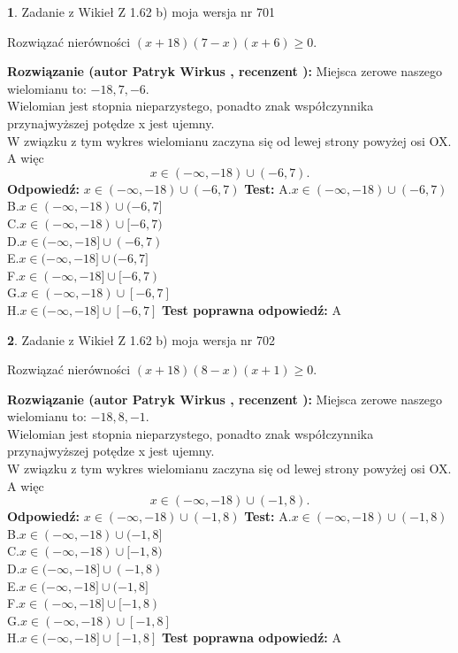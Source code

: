 \documentclass[12pt, a4paper]{article}
\theoremstyle{definition} %
\newtheorem{zad}{}
\newcommand{\zadStart}[1]{\begin{zad}#1\newline}
\newcommand{\zadStop}{\end{zad}}
\newcommand{\rozwStart}[2]{\noindent \textbf{Rozwiązanie (autor #1 , recenzent #2): }\newline}
\newcommand{\rozwStop}{\newline}
\newcommand{\odpStart}{\noindent \textbf{Odpowiedź:}\newline}
\newcommand{\odpStop}{\newline}
\newcommand{\testStart}{\noindent \textbf{Test:}\newline}
\newcommand{\testStop}{\newline}
\newcommand{\kluczStart}{\noindent \textbf{Test poprawna odpowiedź:}\newline}
\newcommand{\kluczStop}{\newline}
\begin{document}
\zadStart{Zadanie z Wikieł Z 1.62 b) moja wersja nr 701}

Rozwiązać nierówności $(x+18)(7-x)(x+6)\ge0$.
\zadStop
\rozwStart{Patryk Wirkus}{}
Miejsca zerowe naszego wielomianu to: $-18, 7, -6$.\\
Wielomian jest stopnia nieparzystego, ponadto znak współczynnika przy\linebreak najwyższej potędze x jest ujemny.\\ W związku z tym wykres wielomianu zaczyna się od lewej strony powyżej osi OX. A więc $$x \in (-\infty,-18) \cup (-6,7).$$
\rozwStop
\odpStart
$x \in (-\infty,-18) \cup (-6,7)$
\odpStop
\testStart
A.$x \in (-\infty,-18) \cup (-6,7)$\\
B.$x \in (-\infty,-18) \cup (-6,7]$\\
C.$x \in (-\infty,-18) \cup [-6,7)$\\
D.$x \in (-\infty,-18] \cup (-6,7)$\\
E.$x \in (-\infty,-18] \cup (-6,7]$\\
F.$x \in (-\infty,-18] \cup [-6,7)$\\
G.$x \in (-\infty,-18) \cup [-6,7]$\\
H.$x \in (-\infty,-18] \cup [-6,7]$
\testStop
\kluczStart
A
\kluczStop



\zadStart{Zadanie z Wikieł Z 1.62 b) moja wersja nr 702}

Rozwiązać nierówności $(x+18)(8-x)(x+1)\ge0$.
\zadStop
\rozwStart{Patryk Wirkus}{}
Miejsca zerowe naszego wielomianu to: $-18, 8, -1$.\\
Wielomian jest stopnia nieparzystego, ponadto znak współczynnika przy\linebreak najwyższej potędze x jest ujemny.\\ W związku z tym wykres wielomianu zaczyna się od lewej strony powyżej osi OX. A więc $$x \in (-\infty,-18) \cup (-1,8).$$
\rozwStop
\odpStart
$x \in (-\infty,-18) \cup (-1,8)$
\odpStop
\testStart
A.$x \in (-\infty,-18) \cup (-1,8)$\\
B.$x \in (-\infty,-18) \cup (-1,8]$\\
C.$x \in (-\infty,-18) \cup [-1,8)$\\
D.$x \in (-\infty,-18] \cup (-1,8)$\\
E.$x \in (-\infty,-18] \cup (-1,8]$\\
F.$x \in (-\infty,-18] \cup [-1,8)$\\
G.$x \in (-\infty,-18) \cup [-1,8]$\\
H.$x \in (-\infty,-18] \cup [-1,8]$
\testStop
\kluczStart
A
\kluczStop
\end{document}
